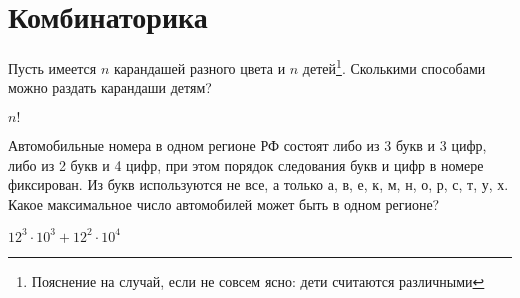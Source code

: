 \documentclass[a4paper, 11pt]{article}
\begin{document}
\section{Комбинаторика}
\begin{problem}
	Пусть имеется $n$ карандашей разного цвета и $n$ детей\footnote{Пояснение на случай,
	если не совсем ясно: дети считаются различными}. Сколькими способами можно раздать
	карандаши детям?
\end{problem}
\begin{answer}
	$n!$
\end{answer}
\begin{problem}
	Автомобильные номера в одном регионе РФ состоят либо из 3 букв и 3 цифр, либо из 2 букв и 4
	цифр, при этом порядок следования букв и цифр в номере фиксирован. Из букв используются не все, а
	только а, в, е, к, м, н, о, р, с, т, у, х. Какое максимальное число автомобилей может быть в одном регионе?
\end{problem}
\begin{answer}
	$12^3 \cdot 10^3 + 12^2 \cdot 10^4$
\end{answer}
\end{document}
